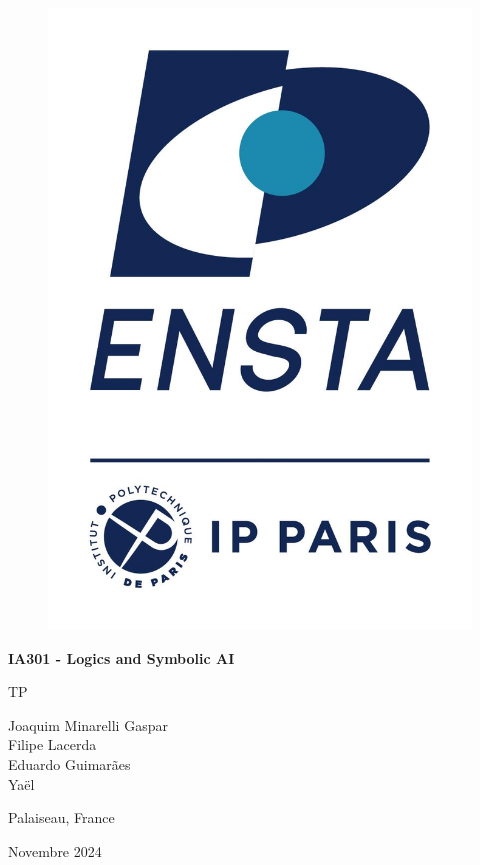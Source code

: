 \documentclass[12pt]{article}
\begin{document}

\begin{titlepage}
 \centering
 \vspace*{1in}
 \begin{figure}[t]
    \centering
    \includegraphics[scale=0.5]{images/Logo_ENSTA_Paris.jpg}
\end{figure}
 \begin{Huge}\bfseries
 IA301 - Logics and Symbolic AI
  
  TP\par
 \end{Huge}
 \vspace{1.5in}
 \begin{large}\bfseries

  
Joaquim Minarelli Gaspar\\
Filipe Lacerda\\
Eduardo Guimarães\\
Yaël

 \end{large}
 \vfill
	 
 
 \vspace{0.5in}
 Palaiseau, France
 \par
 
 \vspace{0.5in}
 Novembre 2024
 \par
\end{titlepage}
\end{document}
